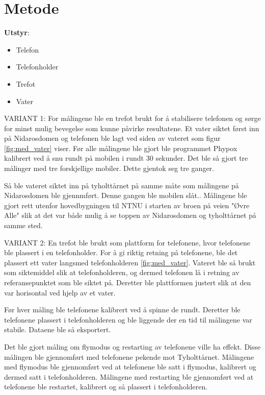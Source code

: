 \section{Metode}
\noindent\textbf{Utstyr}:
\begin{itemize}
    \item Telefon
    \item Telefonholder
    \item Trefot
    \item Vater
\end{itemize}
VARIANT 1:
For målingene ble en trefot brukt for å stabilisere telefonen og sørge for minst mulig bevegelse som kunne påvirke resultatene. Et vater siktet først inn på Nidarosdomen og telefonen ble lagt ved siden av vateret som figur \ref{fig:med_vater} viser. Før alle målingene ble gjort ble programmet Phypox kalibrert ved å snu rundt på mobilen i rundt 30 sekunder. Det ble så gjort tre målinger med tre forskjellige mobiler. Dette gjentok seg tre ganger.

Så ble vateret siktet inn på tyholttårnet på samme måte som målingene på Nidarosdomen ble gjennmført. Denne gangen ble mobilen slåt..
Målingene ble gjort rett utenfor hovedbygningen til NTNU i starten av broen på veien "Øvre Alle" slik at det var både mulig å se toppen av Nidarosdomen og tyholttårnet på samme sted.  \newline


VARIANT 2:
En trefot ble brukt som plattform for telefonene, hvor telefonene ble plassert i en telefonholder. For å gi riktig retning på telefonene, ble det plassert ett vater langsmed telefonholderen \ref{fig:med_vater}. Vateret ble så brukt som siktemiddel slik at telefonholderen, og dermed telefonen lå i retning av referansepunktet som ble siktet på. Deretter ble plattformen justert slik at den var horisontal ved hjelp av et vater.

Før hver måling ble telefonene kalibrert ved å spinne de rundt. Deretter ble telefonene plassert i telefonholderen og ble liggende der en tid til målingene var stabile. Dataene ble så eksportert. 

Det ble gjort måling om flymodus og restarting av telefonene ville ha effekt. Disse målingen ble gjennomført med telefonene pekende mot Tyholttårnet. Målingene med flymodus ble gjennomført ved at telefonene ble satt i flymodus, kalibrert og dermed satt i telefonholderen. Målingene med restarting ble gjennomført ved at telefonene ble restartet, kalibrert og så plassert i telefonholderen.

